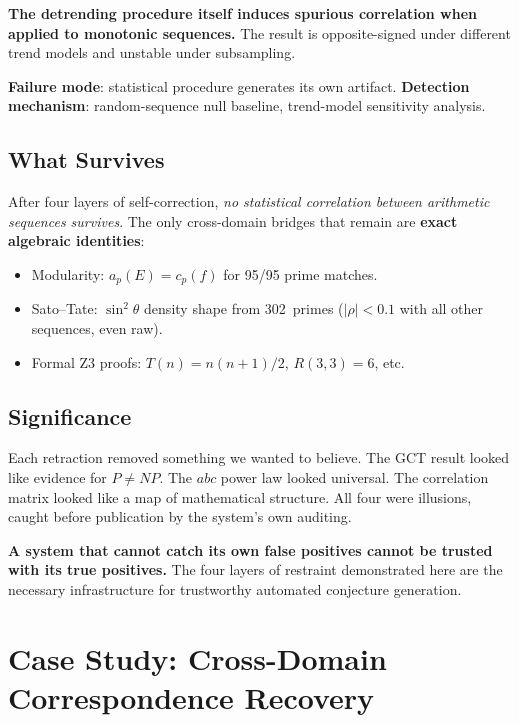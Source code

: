 \documentclass[11pt,a4paper]{article}
\begin{document}
\textbf{The detrending procedure itself induces spurious correlation
when applied to monotonic sequences.} The result is opposite-signed
under different trend models and unstable under subsampling.

\textbf{Failure mode}: statistical procedure generates its own artifact.
\textbf{Detection mechanism}: random-sequence null baseline,
trend-model sensitivity analysis.

\subsection{What Survives}

After four layers of self-correction, \emph{no statistical correlation
between arithmetic sequences survives}. The only cross-domain bridges
that remain are \textbf{exact algebraic identities}:

\begin{itemize}
  \item Modularity: $a_p(E) = c_p(f)$ for 95/95 prime matches.
  \item Sato--Tate: $\sin^2\theta$ density shape from 302~primes
    ($|\rho| < 0.1$ with all other sequences, even raw).
  \item Formal Z3 proofs: $T(n) = n(n+1)/2$, $R(3,3) = 6$, etc.
\end{itemize}

\subsection{Significance}

Each retraction removed something we wanted to believe. The GCT result
looked like evidence for $P \neq NP$. The $abc$ power law looked
universal. The correlation matrix looked like a map of mathematical
structure. All four were illusions, caught before publication by the
system's own auditing.

\textbf{A system that cannot catch its own false positives cannot be
trusted with its true positives.} The four layers of restraint
demonstrated here are the necessary infrastructure for trustworthy
automated conjecture generation.


\section{Case Study: Cross-Domain Correspondence Recovery}
\label{sec:langlands}
\end{document}
